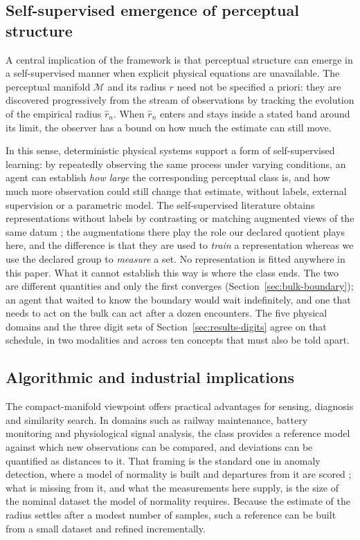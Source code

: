 \documentclass[10pt]{article}
\theoremstyle{plain}
\theoremstyle{definition}
\theoremstyle{remark}
\begin{document}
\subsection{Self-supervised emergence of perceptual structure}

A central implication of the framework is that perceptual structure can
emerge in a self-supervised manner when explicit physical equations are
unavailable. The perceptual manifold $\mathcal{M}$ and its radius $r$ need
not be specified a priori: they are discovered progressively from the
stream of observations by tracking the evolution of the empirical radius
$\hat r_n$. When $\hat r_n$ enters and stays inside a stated band around its
limit, the observer has a bound on how much the estimate can still move.

In this sense, deterministic physical systems support a form of self-supervised
learning: by repeatedly observing the same process under varying conditions, an
agent can establish \emph{how large} the corresponding perceptual class is, and
how much more observation could still change that estimate, without labels,
external supervision or a parametric model. The self-supervised literature
obtains representations without labels by contrasting or matching augmented
views of the same datum \citep{chen2020simple, caron2021emerging,
balestriero2023cookbook}; the augmentations there play the role our declared
quotient plays here, and the difference is that they are used to \emph{train} a
representation whereas we use the declared group to \emph{measure} a set. No
representation is fitted anywhere in this paper. What it cannot establish this way
is where the class ends. The two are different quantities and only the first
converges (Section~\ref{sec:bulk-boundary}); an agent that waited to know the
boundary would wait indefinitely, and one that needs to act on the bulk can act
after a dozen encounters. The five physical domains and the three digit sets of
Section~\ref{sec:results-digits} agree on that schedule, in two modalities and
across ten concepts that must also be told apart.

\subsection{Algorithmic and industrial implications}

The compact-manifold viewpoint offers practical advantages for sensing,
diagnosis and similarity search. In domains such as railway maintenance,
battery monitoring and physiological signal analysis, the class provides a
reference model against which new observations can be compared, and deviations
can be quantified as distances to it. That framing is the standard one in
anomaly detection, where a model of normality is built and departures from it
are scored \citep{chandola2009anomaly, scholkopf2001estimating}; what is missing
from it, and what the measurements here supply, is the size of the nominal
dataset the model of normality requires. Because the estimate of the radius
settles after a modest number of samples, such a reference can be built from a
small dataset and refined incrementally.
\end{document}
